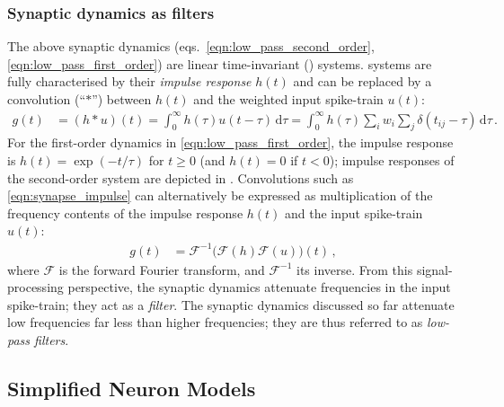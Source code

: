 \subsubsection{Synaptic dynamics as filters}
The above synaptic dynamics (eqs.~\ref{eqn:low_pass_second_order}, \ref{eqn:low_pass_first_order}) are linear time-invariant (\LTI) systems.
\LTI systems are fully characterised by their \emph{impulse response} $h(t)$ and can be replaced by a convolution (\enquote{$\ast$}) between $h(t)$ and the weighted input spike-train $u(t)$:
\begin{align}
	g(t)
		&= (h \ast u)(t)
		 = \int_0^\infty h(\tau) u(t - \tau) \,\mathrm{d}\tau
		 = \int_0^\infty h(\tau) \sum\nolimits_{i}  w_i \sum\nolimits_{j} \delta(t_{ij} - \tau) \,\mathrm{d}\tau \,.
	\label{eqn:synapse_impulse}
\end{align}
For the first-order dynamics in \cref{eqn:low_pass_first_order}, the impulse response is $h(t) = \exp(-t/\tau)$ for $t \geq 0$ (and $h(t)= 0$ if $t < 0$); impulse responses of the second-order system are depicted in .
Convolutions such as \cref{eqn:synapse_impulse} can alternatively be expressed as multiplication of the frequency contents of the impulse response $h(t)$ and the input spike-train $u(t)$:
\begin{align}
	g(t) &= \mathcal{F}^{-1} \bigl(\mathcal{F}(h) \mathcal{F}(u) \bigr)(t) \,,
\end{align}
where $\mathcal{F}$ is the forward Fourier transform, and $\mathcal{F}^{-1}$ its inverse.
From this signal-processing perspective, the synaptic dynamics attenuate frequencies in the input spike-train; they act as a \emph{filter}.
The synaptic dynamics discussed so far attenuate low frequencies far less than higher frequencies; they are thus referred to as \emph{low-pass filters}.


\newpage

\subsection{Simplified Neuron Models}
\label{sec:simplified_neuron_models}

